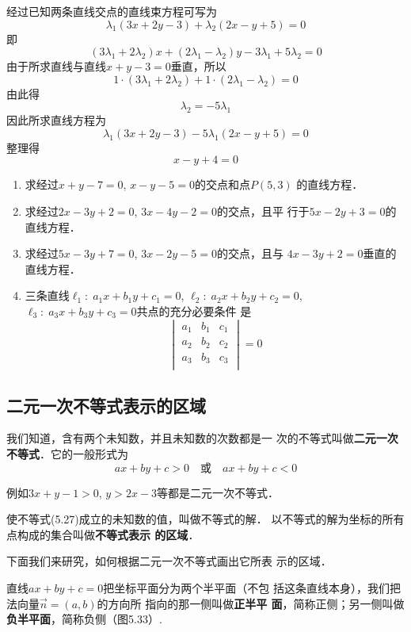 \begin{solution}
    经过已知两条直线交点的直线束方程可写为
\[\lambda_1(3x+2y-3)+\lambda_2(2x-y+5)=0\]
即
\[(3\lambda_1+2\lambda_2)x+(2\lambda_1-\lambda_2)y-3\lambda_1+5\lambda_2=0\]
由于所求直线与直线$x+y-3=0$垂直，所以
\[1\cdot (3\lambda_1+2\lambda_2)+1\cdot (2\lambda_1-\lambda_2)=0\]
由此得
\[\lambda_2=-5\lambda_1\]
因此所求直线方程为
\[\lambda_1(3x+2y-3)-5\lambda_1(2x-y+5)=0\]
整理得
\[x-y+4=0\]
\end{solution}

\begin{ex}
\begin{enumerate}
    \item 求经过$x+y-7=0$, $x-y-5=0$的交点和点$P(5,3)$
    的直线方程．
    \item 求经过$2x-3y+2=0$, $3x-4y-2=0$的交点，且平
    行于$5x-2y+3=0$的直线方程．
    \item 求经过$5x-3y+7=0$, $3x-2y-5=0$的交点，且与
    $4x-3y+2=0$垂直的直线方程．
    \item 三条直线$\ell_1:\; a_1x+b_1y+c_1=0$, $\ell_2:\; a_2x+b_2y+c_2=0$, $\ell_3:\; a_3x+b_3y+c_3=0$共点的充分必要条件
    是
\[\begin{vmatrix}
    a_1&b_1&c_1\\
    a_2&b_2&c_2\\
    a_3&b_3&c_3\\
\end{vmatrix}=0\]
\end{enumerate}
\end{ex}

\subsection{二元一次不等式表示的区域}
我们知道，含有两个未知数，并且未知数的次数都是一
次的不等式叫做\textbf{二元一次不等式}．它的一般形式为
\begin{equation}
    ax+by+c>0\quad \text{或}\quad ax+by+c<0
\end{equation}

例如$3x+y-1>0$, $y>2x-3$等都是二元一次不等式．

使不等式(5.27)成立的未知数的值，叫做不等式的解．
以不等式的解为坐标的所有点构成的集合叫做\textbf{不等式表示
的区域}．

下面我们来研究，如何根据二元一次不等式画出它所表
示的区域．

直线$ax+by+c=0$把坐标平面分为两个半平面（不包
括这条直线本身），我们把
法向量$\vec{n}=(a,b)$的方向所
指向的那一侧叫做\textbf{正半平
面}，简称正侧；另一侧叫做
\textbf{负半平面}，简称负侧（图5.33）.

